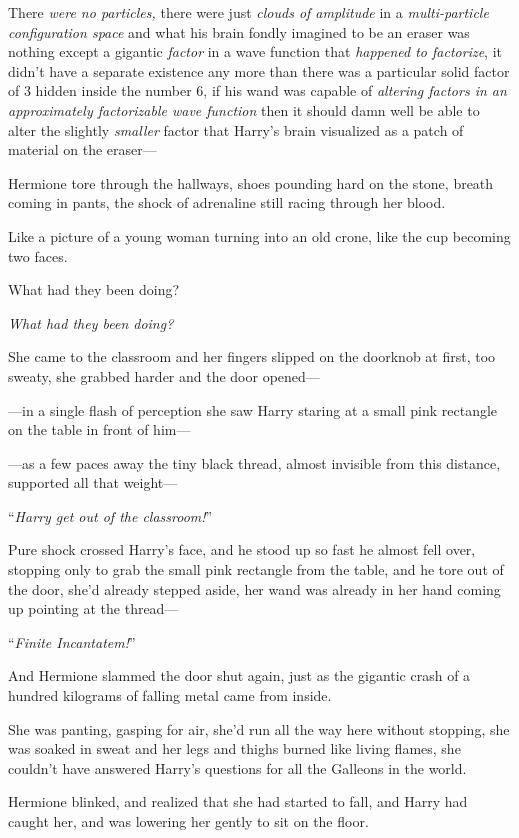 There \emph{were no particles,} there were just \emph{clouds of amplitude} in a \emph{multi-particle configuration space} and what his brain fondly imagined to be an eraser was nothing except a gigantic \emph{factor} in a wave function that \emph{happened to factorize}, it didn’t have a separate existence any more than there was a particular solid factor of 3 hidden inside the number 6, if his wand was capable of \emph{altering factors in an approximately factorizable wave function} then it should damn well be able to alter the slightly \emph{smaller} factor that Harry’s brain visualized as a patch of material on the eraser—

\later

Hermione tore through the hallways, shoes pounding hard on the stone, breath coming in pants, the shock of adrenaline still racing through her blood.

Like a picture of a young woman turning into an old crone, like the cup becoming two faces.

What had they been doing?

\emph{What had they been doing?}

She came to the classroom and her fingers slipped on the doorknob at first, too sweaty, she grabbed harder and the door opened—

—in a single flash of perception she saw Harry staring at a small pink rectangle on the table in front of him—

—as a few paces away the tiny black thread, almost invisible from this distance, supported all that weight—

“\emph{Harry get out of the classroom!}”

Pure shock crossed Harry’s face, and he stood up so fast he almost fell over, stopping only to grab the small pink rectangle from the table, and he tore out of the door, she’d already stepped aside, her wand was already in her hand coming up pointing at the thread—

“\emph{Finite Incantatem!}”

And Hermione slammed the door shut again, just as the gigantic crash of a hundred kilograms of falling metal came from inside.

She was panting, gasping for air, she’d run all the way here without stopping, she was soaked in sweat and her legs and thighs burned like living flames, she couldn’t have answered Harry’s questions for all the Galleons in the world.

Hermione blinked, and realized that she had started to fall, and Harry had caught her, and was lowering her gently to sit on the floor.

